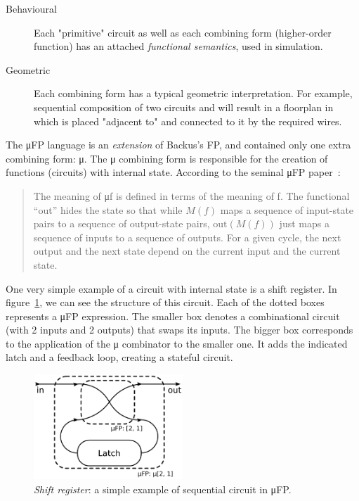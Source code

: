         \begin{description}
            \item[Behavioural]
                Each "primitive" circuit as well as each combining form (higher-order function)
                has an attached \emph{functional semantics}, used in simulation.
            \item[Geometric]
                Each combining form has a typical geometric interpretation.
                For example, sequential composition of two circuits  and  will result
                in a floorplan in which  is placed "adjacent to"  and connected to it
                by the required wires.
        \end{description}

        The μFP language is an \emph{extension} of Backus's FP, and contained only one extra combining form: μ.
        The μ combining form is responsible for the creation of functions (circuits) with internal state.
        According to the seminal μFP paper~\cite{mufp-1984}:

        \begin{quote}
            The meaning of μf is defined in terms of the meaning of f.
            The functional ``out'' hides the state
            so that while $M(f)$ maps a sequence of input-state pairs to a sequence of output-state pairs,
            $\text{out}(M(f))$ just maps a sequence of inputs to a sequence of outputs.
            For a given cycle, the next output and the next state depend on the current input and the current state.
        \end{quote}

        One very simple example of a circuit with internal state is a shift register.
        In figure~\ref{fig:mufp-shift}, we can see the structure of this circuit.
        Each of the dotted boxes represents a μFP expression.
        The smaller box denotes a combinational circuit (with 2 inputs and 2 outputs) that swaps its inputs.
        The bigger box corresponds to the application of the μ combinator to the smaller one.
        It adds the indicated latch and a feedback loop, creating a stateful circuit.

        \begin{figure}[h]
            \centerline{\includegraphics[width=0.5\textwidth]{imgs/mufp-shift.pdf}}
            \caption{\emph{Shift register}: a simple example of sequential circuit in μFP. \label{fig:mufp-shift}}
        \end{figure}

